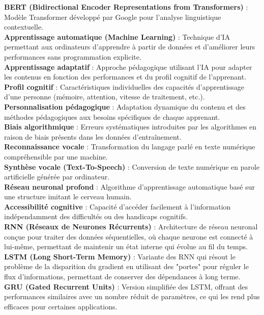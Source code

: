 \documentclass[11pt,a4paper]{report}
\begin{document}
\textbf{BERT (Bidirectional Encoder Representations from Transformers)} : Modèle Transformer développé par Google pour l'analyse linguistique contextuelle.\\
\textbf{Apprentissage automatique (Machine Learning)} : Technique d’IA permettant aux ordinateurs d’apprendre à partir de données et d’améliorer leurs performances sans programmation explicite.\\
\textbf{Apprentissage adaptatif} : Approche pédagogique utilisant l’IA pour adapter les contenus en fonction des performances et du profil cognitif de l’apprenant.\\
\textbf{Profil cognitif} : Caractéristiques individuelles des capacités d’apprentissage d’une personne (mémoire, attention, vitesse de traitement, etc.).\\
\textbf{Personnalisation pédagogique} : Adaptation dynamique du contenu et des méthodes pédagogiques aux besoins spécifiques de chaque apprenant.\\
\textbf{Biais algorithmique} : Erreurs systématiques introduites par les algorithmes en raison de biais présents dans les données d’entraînement.\\
\textbf{Reconnaissance vocale} : Transformation du langage parlé en texte numérique compréhensible par une machine.\\
\textbf{Synthèse vocale (Text-To-Speech)} : Conversion de texte numérique en parole artificielle générée par ordinateur.\\
\textbf{Réseau neuronal profond} : Algorithme d’apprentissage automatique basé sur une structure imitant le cerveau humain.\\
\textbf{Accessibilité cognitive} : Capacité d'accéder facilement à l’information indépendamment des difficultés ou des handicaps cognitifs.\\
\textbf{RNN (Réseaux de Neurones Récurrents)} : Architecture de réseau neuronal conçue pour traiter des données séquentielles, où chaque neurone est connecté à lui-même, permettant de maintenir un état interne qui évolue au fil du temps.\\
\textbf{LSTM (Long Short-Term Memory)} : Variante des RNN qui résout le problème de la disparition du gradient en utilisant des "portes" pour réguler le flux d’informations, permettant de conserver des dépendances à long terme.\\
\textbf{GRU (Gated Recurrent Units)} : Version simplifiée des LSTM, offrant des performances similaires avec un nombre réduit de paramètres, ce qui les rend plus efficaces pour certaines applications.\\
\end{document}
